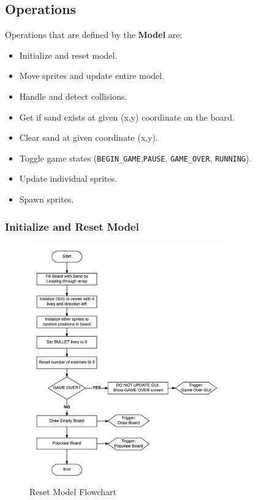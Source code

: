     \subsection{Operations}

    Operations that are defined by the \textbf{Model} are:

    \begin{itemize}
      \item Initialize and reset model.
      \item Move sprites and update entire model.
      \item Handle and detect collisions.
      \item Get if sand exists at given (x,y) coordinate on the board.
      \item Clear sand at given coordinate (x,y).
      \item Toggle game states (\texttt{BEGIN\_GAME},\texttt{PAUSE}, \texttt{GAME\_OVER}, \texttt{RUNNING}).
      \item Update individual sprites.
      \item Spawn sprites.
    \end{itemize}

    \subsubsection{Initialize and Reset Model}

    \begin{figure}[H]
      \centering
      \includegraphics[width=0.75\textwidth]{images/reset-model.png}
      \caption{\label{fig:reset-model} Reset Model Flowchart}
    \end{figure}

